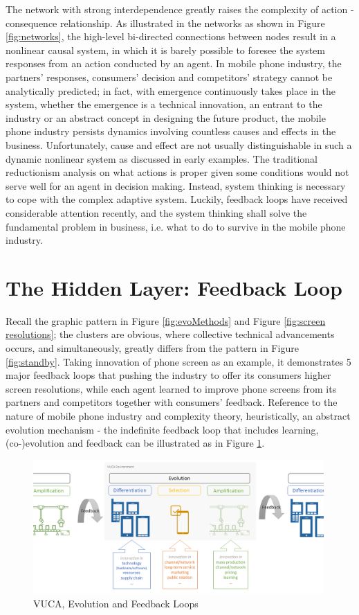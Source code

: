 \documentclass[utf8,english]{gradu3}
\begin{document}
The network with strong interdependence greatly raises the complexity of action - consequence relationship. As illustrated in the networks as shown in Figure \ref{fig:networks}, the high-level bi-directed connections between nodes result in a nonlinear causal system, in which it is barely possible to foresee the system responses from an action conducted by an agent. In mobile phone industry, the partners' responses, consumers' decision and competitors' strategy cannot be analytically predicted; in fact, with emergence continuously takes place in the system, whether the emergence is a technical innovation, an entrant to the industry or an abstract concept in designing the future product, the mobile phone industry persists dynamics involving countless causes and effects in the business. Unfortunately, cause and effect are not usually distinguishable in such a dynamic nonlinear system as discussed in early examples. The traditional reductionism analysis on what actions is proper given some conditions would not serve well for an agent in decision making. Instead, system thinking is necessary to cope with the complex adaptive system. Luckily, feedback loops have received considerable attention recently, and the system thinking shall solve the fundamental problem in business, i.e. what to do to survive in the mobile phone industry.

\section{The Hidden Layer: Feedback Loop}

Recall the graphic pattern in Figure \ref{fig:evoMethods} and Figure \ref{fig:screen resolutions}; the clusters are obvious, where collective technical advancements occurs, and simultaneously, greatly differs from the pattern in Figure \ref{fig:standby}. Taking innovation of phone screen as an example, it demonstrates 5 major feedback loops that pushing the industry to offer its consumers higher screen resolutions, while each agent learned to improve phone screens from its partners and competitors together with consumers' feedback. Reference to the nature of mobile phone industry and complexity theory, heuristically, an abstract evolution mechanism - the indefinite feedback loop that includes learning, (co-)evolution and feedback can be illustrated as in Figure \ref{fig:feeback loops}.

\begin{figure}[htb]
    \centering
    \includegraphics[width=0.99\textwidth]{feedback.png}
    \caption{VUCA, Evolution and Feedback Loops}
    \label{fig:feeback loops}
\end{figure}
\end{document}
